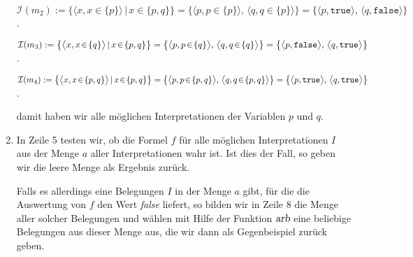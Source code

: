\begin{enumerate}
      $\mathcal{I}(m_2) := \bigl\{ \bigl\langle x, x \!\in\! \{p\} \bigl\rangle\, |\, x \!\in\! \{p,q\} \bigr\} = \bigl\{ \bigl\langle p, p \!\in\! \{p\} \bigl\rangle,\, \bigl\langle q, q \!\in\! \{p\} \bigl\rangle \bigr\} = \bigl\{ \bigl\langle p, \texttt{true} \bigl\rangle,\, \bigl\langle q, \texttt{false} \bigl\rangle \bigr\}$.

      ${\cal I}(m_3) := \bigl\{ \bigl\langle x, x \!\in\! \{q\} \bigl\rangle\, |\, x \!\in\! \{p,q\} \bigr\} = \bigl\{ \bigl\langle p, p \!\in\! \{q\} \bigl\rangle,\, \bigl\langle q, q \!\in\! \{q\} \bigl\rangle \bigr\} = \bigl\{ \bigl\langle p, \texttt{false} \bigl\rangle,\, \bigl\langle q, \texttt{true} \bigl\rangle \bigr\}$.

      ${\cal I}(m_4) := \bigl\{ \bigl\langle x, x \!\in\! \{p,q\} \bigl\rangle\, |\, x \!\in\! \{p,q\} \bigr\} = \bigl\{ \bigl\langle p, p \!\in\! \{p,q\} \bigl\rangle,\, \bigl\langle q, q \!\in\! \{p,q\} \bigl\rangle \bigr\} = \bigl\{ \bigl\langle p, \texttt{true} \bigl\rangle,\, \bigl\langle q, \texttt{true} \bigl\rangle \bigr\}$.

      damit haben wir alle m\"{o}glichen Interpretationen der Variablen $p$ und $q$. 
\item In Zeile 5 testen wir, ob die Formel $f$ f\"{u}r alle m\"{o}glichen Interpretationen $I$
      aus der Menge $a$ aller Interpretationen wahr ist.  Ist dies der Fall,
      so geben wir die leere Menge als Ergebnis zur\"{u}ck.

      Falls es allerdings eine Belegungen $I$ in der Menge $a$ gibt, f\"{u}r die die
      Auswertung von $f$ den Wert \textsl{false} liefert, so bilden wir in Zeile 8 die
      Menge aller solcher Belegungen und w\"{a}hlen mit Hilfe der Funktion
      $\textsl{arb}$ eine beliebige Belegungen aus dieser Menge aus, die wir dann
      als Gegenbeispiel zur\"{u}ck geben.
\end{enumerate}

